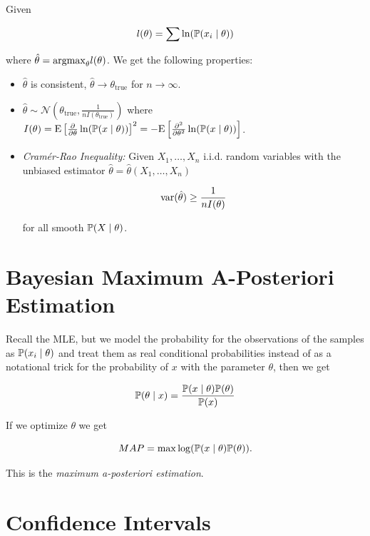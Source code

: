 Given 

\[
    l(\theta) = \sum \ln (\mathbb{P}(x_i \mid \theta))
\]

where \(\hat{\theta} = \mathrm{argmax}_\theta l(\theta)\). We get the following properties:

\begin{itemize}

    \item \(\hat{\theta}\) is consistent, \(\hat{\theta} \to \theta_{\text{true}}\) for \(n \to \infty\).

    \item \(\hat{\theta} \sim \mathcal{N}\left(\theta_{\text{true}}, \frac{1}{n I(\theta_{\text{true}})}\right)\)
    where \(I(\theta) = \mathrm{E} \left[\frac{\partial}{\partial \theta} \ln(\mathbb{P}(x \mid \theta))\right]^2 = - \mathrm{E} \left[\frac{\partial^2}{\partial \theta^2} \ln(\mathbb{P}(x \mid \theta))\right]\).

    \item \emph{Cramér-Rao Inequality:} Given \(X_1, \dots, X_n\) i.i.d. random variables with the unbiased estimator \(\hat{\theta} = \hat{\theta}(X_1, \dots, X_n)\)

    \[
        \mathrm{var}(\hat{\theta}) \ge \frac{1}{n I(\theta)} 
    \]

    for all smooth \(\mathbb{P}(X \mid \theta)\).

\end{itemize}

\section{Bayesian Maximum A-Posteriori Estimation}

Recall the MLE, but we model the probability for the observations of the samples as \(\mathbb{P}(x_i \mid \theta)\) and treat 
them as real conditional probabilities instead of as a notational trick for the probability of \(x\) with the parameter \(\theta\), then we get 

\[
    \mathbb{P}(\theta \mid x) = \frac{\mathbb{P}(x \mid \theta) \mathbb{P}(\theta)}{\mathbb{P}(x)}
\]

If we optimize \(\theta\) we get 

\[
    MAP = \max \log(\mathbb{P}(x \mid \theta) \mathbb{P}(\theta)).
\]

This is the \emph{maximum a-posteriori estimation}.

\section{Confidence Intervals}

